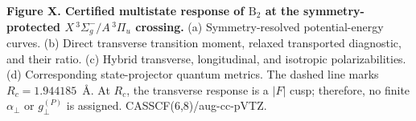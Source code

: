 \textbf{Figure X. Certified multistate response of \(\mathrm{B}_2\) at the symmetry-protected \(X\,^3\Sigma_g^- / A\,^3\Pi_u\) crossing.} (a) Symmetry-resolved potential-energy curves. (b) Direct transverse transition moment, relaxed transported diagnostic, and their ratio. (c) Hybrid transverse, longitudinal, and isotropic polarizabilities. (d) Corresponding state-projector quantum metrics. The dashed line marks \(R_c=1.944185\)~\AA. At \(R_c\), the transverse response is a \(|F|\) cusp; therefore, no finite \(\alpha_\perp\) or \(g_\perp^{(P)}\) is assigned. CASSCF(6,8)/aug-cc-pVTZ.
